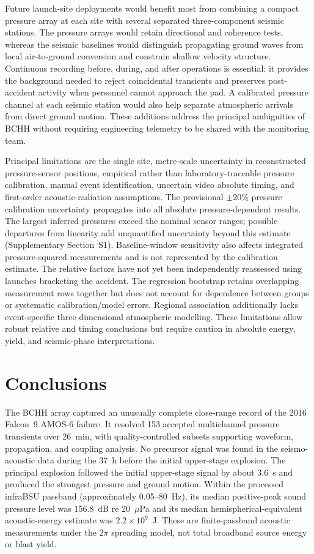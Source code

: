 \documentclass[]{seismica}
\begin{document}
Future launch-site deployments would benefit most from combining a compact
pressure array at each site with several separated three-component seismic
stations. The pressure arrays would retain directional and coherence tests,
whereas the seismic baselines would distinguish propagating ground waves from
local air-to-ground conversion and constrain shallow velocity structure.
Continuous recording before, during, and after operations is essential: it
provides the background needed to reject coincidental transients and preserves
post-accident activity when personnel cannot approach the pad. A calibrated
pressure channel at each seismic station would also help separate atmospheric
arrivals from direct ground motion. These additions address the principal
ambiguities of BCHH without requiring engineering telemetry to be shared with
the monitoring team.

Principal limitations are the single site, metre-scale uncertainty in
reconstructed pressure-sensor positions, empirical rather than
laboratory-traceable pressure calibration, manual event identification, uncertain video
absolute timing, and first-order acoustic-radiation assumptions. The provisional
$\pm20\%$ pressure calibration uncertainty propagates into all absolute
pressure-dependent results. The largest inferred pressures exceed the nominal
sensor ranges; possible departures from linearity add unquantified uncertainty
beyond this estimate (Supplementary Section~S1). Baseline-window sensitivity
also affects integrated pressure-squared measurements and is not represented
by the calibration estimate. The relative factors have not
yet been independently reassessed using launches bracketing the accident. The regression
bootstrap retains overlapping measurement rows together but does not account
for dependence between groups or systematic calibration/model errors. Regional
association additionally lacks event-specific three-dimensional atmospheric
modelling. These limitations allow robust relative and timing conclusions but
require caution in absolute energy, yield, and seismic-phase interpretations.

\section{Conclusions}
\label{sec:conclusions}

The BCHH array captured an unusually complete close-range record of the 2016
Falcon~9 AMOS-6 failure. It resolved 153 accepted multichannel pressure
transients over 26~min, with quality-controlled subsets supporting waveform,
propagation, and coupling analysis. No precursor signal was found in the
seismo-acoustic data during the 37~h before the initial upper-stage explosion. The principal explosion followed
the initial upper-stage signal by about 3.6~s and produced the strongest pressure
and ground motion. Within the processed infraBSU passband (approximately
0.05--80~Hz), its median positive-peak sound pressure level was 156.8~dB re
20~$\mu$Pa and its median hemispherical-equivalent acoustic-energy estimate was
$2.2\times10^9$~J. These are
finite-passband acoustic measurements under the $2\pi$ spreading model, not
total broadband source energy or blast yield.
\end{document}
